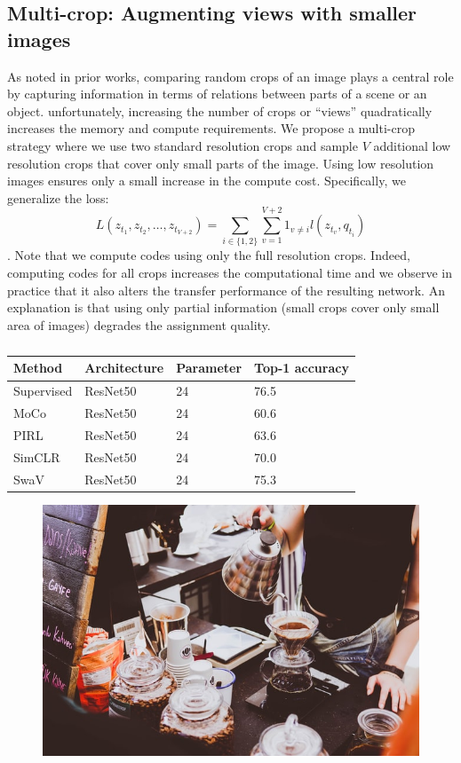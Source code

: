 \documentclass[conference]{IEEEtran}
\begin{document}
\subsection{Multi-crop: Augmenting views with smaller images}
As noted in prior works, comparing random crops of an image plays a central role by capturing information in terms of relations between parts of a scene or an object.
unfortunately, increasing the number of crops or ``views'' quadratically increases the memory and compute requirements.
We propose a multi-crop strategy where we use two standard resolution crops and sample $V$ additional low resolution crops that cover only small parts of the image.
Using low resolution images ensures only a small increase in the compute cost. Specifically, we generalize the loss:
\begin{equation}
    L(z_{t_1}, z_{t_2}, \ldots, z_{t_{V+2}}) = \sum_{i \in \{1,2\}}\sum_{v=1}^{V+2}1_{v \neq i}l(z_{t_v}, q_{t_i})
\end{equation}.
Note that we compute codes using only the full resolution crops. Indeed, computing codes for all crops increases the computational time and we observe in practice that it also alters the transfer performance of the resulting network.
An explanation is that using only partial information (small crops cover only small area of images) degrades the assignment quality. 

\begin{table}[]
    \caption{}
    \label{tab:my-table}
    \begin{tabular}{llll}
    \hline
    \multicolumn{1}{|l|}{Method} & \multicolumn{1}{l|}{Architecture} & \multicolumn{1}{l|}{Parameter} & \multicolumn{1}{l|}{Top-1 accuracy} \\ \hline
    Supervised & ResNet50 & 24 & 76.5 \\
    MoCo       & ResNet50 & 24 & 60.6 \\
    PIRL       & ResNet50 & 24 & 63.6 \\
    SimCLR     & ResNet50 & 24 & 70.0 \\ \hline
    SwaV       & ResNet50 & 24 & 75.3
    \end{tabular}
    \end{table}

\begin{figure}
    \includegraphics[scale=0.5]{sample}
\end{figure}
\end{document}
